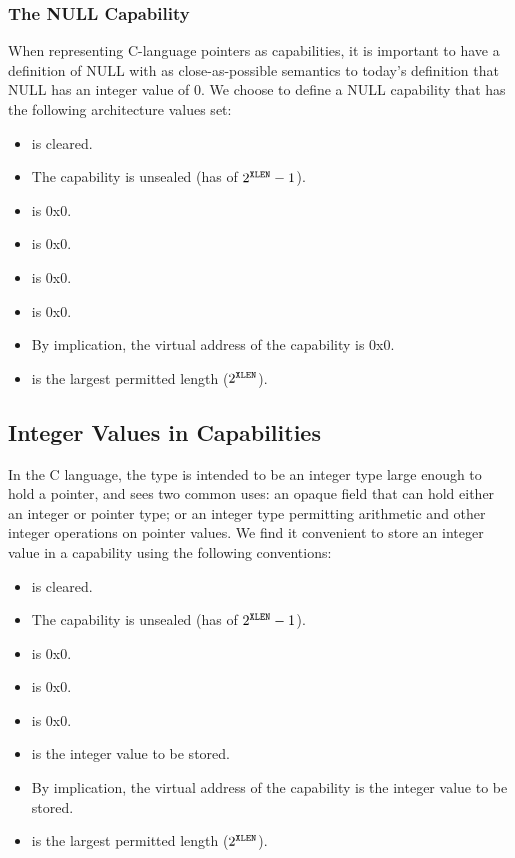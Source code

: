 \subsubsection{The NULL Capability}

When representing C-language pointers as capabilities, it is important to have
a definition of NULL with as close-as-possible semantics to today's
definition that NULL has an integer value of 0.
We choose to define a NULL capability that has the following architecture
values set:

\begin{itemize}
\item \ctag{} is cleared.
\item The capability is unsealed (has \cotype{} of $2^{{\texttt{XLEN}}{}}-1$).
\item \cperms{} is 0x0.
\item \cflags{} is 0x0.
\item \cbase{} is 0x0.
\item \coffset{} is 0x0.
\item By implication, the virtual address of the capability is 0x0.
\item \clength{} is the largest permitted length ($2^{{\texttt{XLEN}}{}}$).
\end{itemize}

\subsection{Integer Values in Capabilities}
\label{subsection:integer_values_in_capabilities}

In the C language, the  type is intended to be an integer
type large enough to hold a pointer, and sees two common uses: an opaque field
that can hold either an integer or pointer type; or an integer type permitting
arithmetic and other integer operations on pointer values.
We find it convenient to store an integer value in a capability using the
following conventions:

\begin{itemize}
\item \ctag{} is cleared.
\item The capability is unsealed (has \cotype{} of $2^{{\texttt{XLEN}}{}}-1$).
\item \cperms{} is 0x0.
\item \cflags{} is 0x0.
\item \cbase{} is 0x0.
\item \coffset{} is the integer value to be stored.
\item By implication, the virtual address of the capability is the integer
  value to be stored.
\item \clength{} is the largest permitted length ($2^{{\texttt{XLEN}}{}}$).
\end{itemize}

